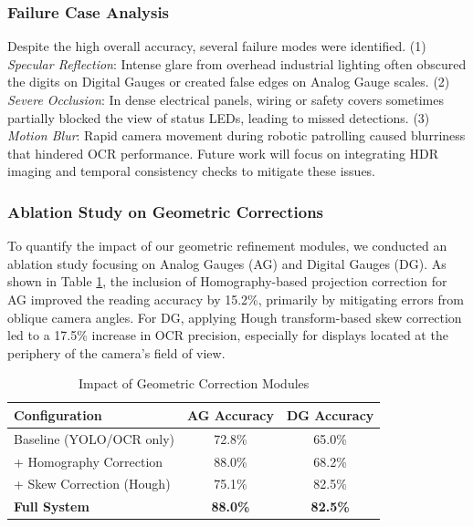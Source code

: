 \subsubsection{Failure Case Analysis}
Despite the high overall accuracy, several failure modes were identified. (1) \textit{Specular Reflection}: Intense glare from overhead industrial lighting often obscured the digits on Digital Gauges or created false edges on Analog Gauge scales. (2) \textit{Severe Occlusion}: In dense electrical panels, wiring or safety covers sometimes partially blocked the view of status LEDs, leading to missed detections. (3) \textit{Motion Blur}: Rapid camera movement during robotic patrolling caused blurriness that hindered OCR performance. Future work will focus on integrating HDR imaging and temporal consistency checks to mitigate these issues.

\subsubsection{Ablation Study on Geometric Corrections}
To quantify the impact of our geometric refinement modules, we conducted an ablation study focusing on Analog Gauges (AG) and Digital Gauges (DG). As shown in Table \ref{tab:ablation}, the inclusion of Homography-based projection correction for AG improved the reading accuracy by 15.2\%, primarily by mitigating errors from oblique camera angles. For DG, applying Hough transform-based skew correction led to a 17.5\% increase in OCR precision, especially for displays located at the periphery of the camera's field of view.

\begin{table}[h]
\caption{Impact of Geometric Correction Modules}
\label{tab:ablation}
\centering
\begin{tabular}{|l|c|c|}
\hline
\textbf{Configuration} & \textbf{AG Accuracy} & \textbf{DG Accuracy} \\
\hline
Baseline (YOLO/OCR only) & 72.8\% & 65.0\% \\
+ Homography Correction & 88.0\% & 68.2\% \\
+ Skew Correction (Hough) & 75.1\% & 82.5\% \\
\textbf{Full System} & \textbf{88.0\%} & \textbf{82.5\%} \\
\hline
\end{tabular}
\end{table}

